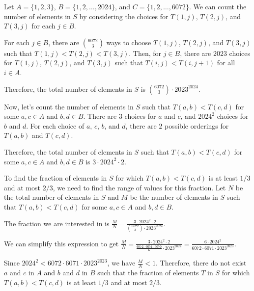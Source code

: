 Let $A = \{1,2,3\}$, $B = \{1,2,\dots,2024\}$, and $C = \{1,2,\dots,6072\}$. We can count the number of elements in $S$ by considering the choices for $T(1,j)$, $T(2,j)$, and $T(3,j)$ for each $j \in B$.

For each $j \in B$, there are $\binom{6072}{3}$ ways to choose $T(1,j)$, $T(2,j)$, and $T(3,j)$ such that $T(1,j) < T(2,j) < T(3,j)$. Then, for $j \in B$, there are $2023$ choices for $T(1,j)$, $T(2,j)$, and $T(3,j)$ such that $T(i,j) < T(i,j+1)$ for all $i \in A$.

Therefore, the total number of elements in $S$ is $\binom{6072}{3} \cdot 2023^{2024}$.

Now, let's count the number of elements in $S$ such that $T(a,b) < T(c,d)$ for some $a,c \in A$ and $b,d \in B$. There are $3$ choices for $a$ and $c$, and $2024^2$ choices for $b$ and $d$. For each choice of $a$, $c$, $b$, and $d$, there are $2$ possible orderings for $T(a,b)$ and $T(c,d)$.

Therefore, the total number of elements in $S$ such that $T(a,b) < T(c,d)$ for some $a,c \in A$ and $b,d \in B$ is $3 \cdot 2024^2 \cdot 2$.

To find the fraction of elements in $S$ for which $T(a,b) < T(c,d)$ is at least $1/3$ and at most $2/3$, we need to find the range of values for this fraction. Let $N$ be the total number of elements in $S$ and $M$ be the number of elements in $S$ such that $T(a,b) < T(c,d)$ for some $a,c \in A$ and $b,d \in B$.

The fraction we are interested in is $\frac{M}{N} = \frac{3 \cdot 2024^2 \cdot 2}{\binom{6072}{3} \cdot 2023^{2024}}$.

We can simplify this expression to get $\frac{M}{N} = \frac{3 \cdot 2024^2 \cdot 2}{\frac{6072 \cdot 6071 \cdot 6070}{6} \cdot 2023^{2024}} = \frac{6 \cdot 2024^2}{6072 \cdot 6071 \cdot 2023^{2023}}$.

Since $2024^2 < 6072 \cdot 6071 \cdot 2023^{2023}$, we have $\frac{M}{N} < 1$. Therefore, there do not exist $a$ and $c$ in $A$ and $b$ and $d$ in $B$ such that the fraction of elements $T$ in $S$ for which $T(a,b) < T(c,d)$ is at least $1/3$ and at most $2/3$.
